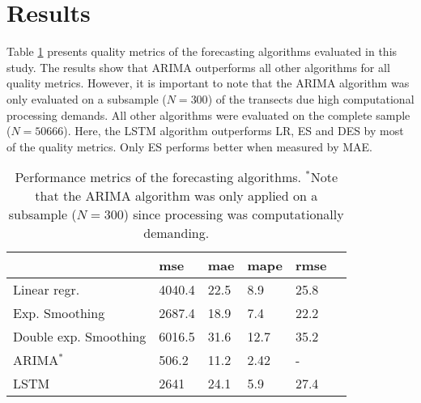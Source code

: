 \documentclass[format=sigconf, review=false, screen=true]{acmart}
\begin{document}

\section{Results}

Table \ref{tab:metrics} presents quality metrics of the forecasting algorithms evaluated in this study. The results show that ARIMA outperforms all other algorithms for all quality metrics. However, it is important to note that the ARIMA algorithm was only evaluated on a subsample ($N=300$) of the transects due high computational processing demands. All other algorithms were evaluated on the complete sample ($N=50666$). Here, the LSTM algorithm outperforms LR, ES and DES by most of the quality metrics. Only ES performs better when measured by MAE.    

\begin{table}[h]
	\centering
	\caption{Performance metrics of the forecasting algorithms. $^*$Note that the ARIMA algorithm was only applied on a subsample ($N=300$) since processing was computationally demanding. }
	\label{tab:metrics}
	\begin{tabular}{llllll}
		\toprule
		                & mse    & mae  & mape & rmse & \\ 
		\midrule
		Linear regr.          & 4040.4 & 22.5 & 8.9  & 25.8 & \\
		Exp. Smoothing        & 2687.4 & 18.9 & 7.4  & 22.2 & \\
		Double exp. Smoothing & 6016.5 & 31.6 & 12.7 & 35.2 & \\
		ARIMA$^*$                 & 506.2  & 11.2 & 2.42 & -    & \\
		LSTM                  & 2641   & 24.1 & 5.9  & 27.4 & \\
		\bottomrule
	\end{tabular}
\end{table}
\end{document}
